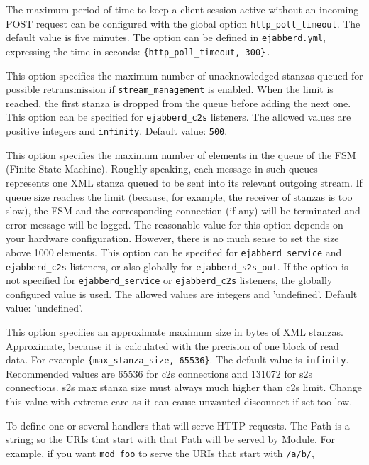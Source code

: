 \documentclass[a4paper,10pt]{book}
\newcommand{\ind}[1]{\begin{latexonly}\index{#1}\end{latexonly}}
\newcommand{\bracehack}{\def\{{\char"7B}\def\}{\char"7D}}
\newcommand{\titem}[1]{\item[\bracehack\texttt{#1}]}
\newcommand{\term}[1]{\texttt{#1}}
\begin{document}
\begin{description}
    The maximum period of time to keep a client session active without
    an incoming POST request can be configured with the global option
    \term{http\_poll\_timeout}. The default value is five minutes.
    The option can be defined in \term{ejabberd.yml}, expressing the time
    in seconds: \verb|{http_poll_timeout, 300}.|
  \titem{max\_ack\_queue: Size}
    This option specifies the maximum number of unacknowledged stanzas
    queued for possible retransmission if \term{stream\_management} is
    enabled. When the limit is reached, the first stanza is dropped from
    the queue before adding the next one. This option can be specified
    for \term{ejabberd\_c2s} listeners. The allowed values are positive
    integers and \term{infinity}. Default value: \term{500}.
  \titem{max\_fsm\_queue: Size}
    This option specifies the maximum number of elements in the queue of the FSM
    (Finite State Machine).
    Roughly speaking, each message in such queues represents one XML
    stanza queued to be sent into its relevant outgoing stream. If queue size
    reaches the limit (because, for example, the receiver of stanzas is too slow),
    the FSM and the corresponding connection (if any) will be terminated
    and error message will be logged.
    The reasonable value for this option depends on your hardware configuration.
    However, there is no much sense to set the size above 1000 elements.
    This option can be specified for \term{ejabberd\_service} and
    \term{ejabberd\_c2s} listeners,
    or also globally for \term{ejabberd\_s2s\_out}.
    If the option is not specified for \term{ejabberd\_service} or
    \term{ejabberd\_c2s} listeners,
    the globally configured value is used.
    The allowed values are integers and 'undefined'.
    Default value: 'undefined'.
  \titem{max\_stanza\_size: Size}
    \ind{options!max\_stanza\_size}This option specifies an
    approximate maximum size in bytes of XML stanzas.  Approximate,
    because it is calculated with the precision of one block of read
    data. For example \verb|{max_stanza_size, 65536}|.  The default
    value is \term{infinity}. Recommended values are 65536 for c2s
    connections and 131072 for s2s connections. s2s max stanza size
    must always much higher than c2s limit. Change this value with
    extreme care as it can cause unwanted disconnect if set too low.
  \titem{request\_handlers: \{Path: Module\}} To define one or several handlers that will serve HTTP requests.
    The Path is a string; so the URIs that start with that Path will be served by Module.
    For example, if you want \term{mod\_foo} to serve the URIs that start with \term{/a/b/},

\end{description}
\end{document}
